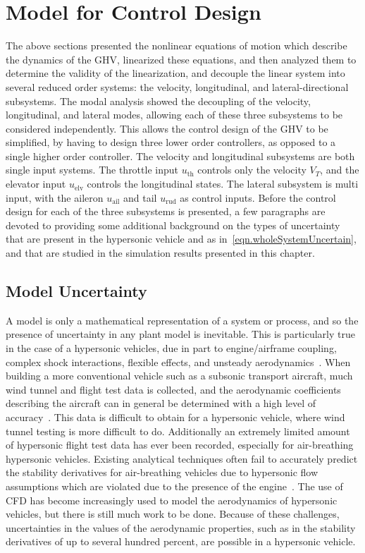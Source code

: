 \section{Model for Control Design}

The above sections presented the nonlinear equations of motion which describe the dynamics of the GHV, linearized these equations, and then analyzed them to determine the validity of the linearization, and decouple the linear system into several reduced order systems: the velocity, longitudinal, and lateral-directional subsystems.
The modal analysis showed the decoupling of the velocity, longitudinal, and lateral modes, allowing each of these three subsystems to be considered independently.
This allows the control design of the GHV to be simplified, by having to design three lower order controllers, as opposed to a single higher order controller.
The velocity and longitudinal subsystems are both single input systems.
The throttle input $u_{\text{th}}$ controls only the velocity $V_{T}$, and the elevator input $u_{\text{elv}}$ controls the longitudinal states.
The lateral subsystem is multi input, with the aileron $u_{\text{ail}}$ and tail $u_{\text{rud}}$ as control inputs.
Before the control design for each of the three subsystems is presented, a few paragraphs are devoted to providing some additional background on the types of uncertainty that are present in the hypersonic vehicle and as in\ \eqref{eqn.wholeSystemUncertain}, and that are studied in the simulation results presented in this chapter.

\subsection{Model Uncertainty}

A model is only a mathematical representation of a system or process, and so the presence of uncertainty in any plant model is inevitable.
This is particularly true in the case of a hypersonic vehicles, due in part to engine/airframe coupling, complex shock interactions, flexible effects, and unsteady aerodynamics\ \cite{mcruer.hypersonic.1991,schmidt.dynamics.1992,rudd.hypersonic.2010}.
When building a more conventional vehicle such as a subsonic transport aircraft, much wind tunnel and flight test data is collected, and the aerodynamic coefficients describing the aircraft can in general be determined with a high level of accuracy\ \cite{maine.coefficients.1981,morelli.parameters.1997}.
This data is difficult to obtain for a hypersonic vehicle, where wind tunnel testing is more difficult to do.
Additionally an extremely limited amount of hypersonic flight test data has ever been recorded, especially for air-breathing hypersonic vehicles.
Existing analytical techniques often fail to accurately predict the stability derivatives for air-breathing vehicles due to hypersonic flow assumptions which are violated due to the presence of the engine\ \cite{rudd.integrated.2000}.
The use of CFD has become increasingly used to model the aerodynamics of hypersonic vehicles, but there is still much work to be done.
Because of these challenges, uncertainties in the values of the aerodynamic properties, such as in the stability derivatives of up to several hundred percent, are possible in a hypersonic vehicle.


